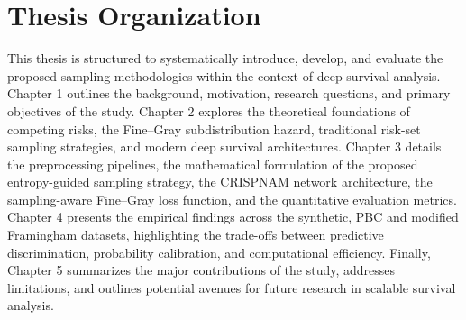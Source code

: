 \documentclass[a4paper,twoside,12pt]{report}
\begin{document}

\section{Thesis Organization}
This thesis is structured to systematically introduce, develop, and evaluate the proposed sampling methodologies within the context of deep survival analysis. Chapter 1 outlines the background, motivation, research questions, and primary objectives of the study. Chapter 2 explores the theoretical foundations of competing risks, the Fine--Gray subdistribution hazard, traditional risk-set sampling strategies, and modern deep survival architectures. Chapter 3 details the preprocessing pipelines, the mathematical formulation of the proposed entropy-guided sampling strategy, the CRISPNAM network architecture, the sampling-aware Fine--Gray loss function, and the quantitative evaluation metrics. Chapter 4 presents the empirical findings across the synthetic, PBC and modified Framingham datasets, highlighting the trade-offs between predictive discrimination, probability calibration, and computational efficiency. Finally, Chapter 5 summarizes the major contributions of the study, addresses limitations, and outlines potential avenues for future research in scalable survival analysis.
\end{document}
